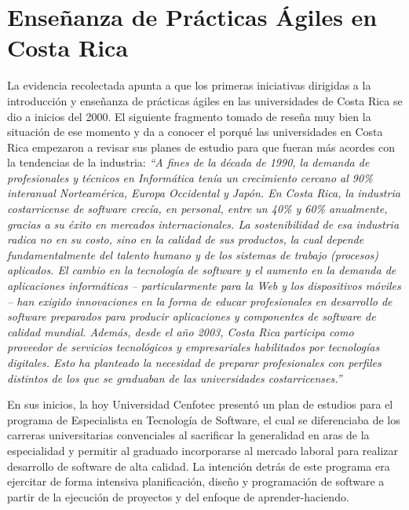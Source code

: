 \section{Enseñanza de Prácticas Ágiles en Costa Rica} \label{sec:costa-rica}
La evidencia recolectada apunta a que los primeras iniciativas dirigidas a la introducción y enseñanza de prácticas ágiles en las universidades de Costa Rica se dio a inicios del 2000. El siguiente fragmento tomado de \cite{cenfotec-2} reseña muy bien la situación de ese momento y da a conocer el porqué las universidades en Costa Rica empezaron a revisar sus planes de estudio para que fueran más acordes con la tendencias de la industria: \emph{``A fines de la década de 1990, la demanda de profesionales y técnicos en Informática tenía un crecimiento cercano al 90\% interanual Norteamérica, Europa Occidental y Japón. En Costa Rica, la industria costarricense de software crecía, en personal, entre un 40\% y 60\% anualmente, gracias a su éxito en mercados internacionales. La sostenibilidad de esa industria radica no en su costo, sino en la calidad de sus productos, la cual depende fundamentalmente del talento humano y de los sistemas de trabajo (procesos) aplicados. El cambio en la tecnología de software y el aumento en la demanda de aplicaciones informáticas – particularmente para la Web y los dispositivos móviles – han exigido innovaciones en la forma de educar profesionales en desarrollo de software preparados para producir aplicaciones y componentes de software de calidad mundial. Además, desde el año 2003, Costa Rica participa como proveedor de servicios tecnológicos y empresariales habilitados por tecnologías digitales. Esto ha planteado la necesidad de preparar profesionales con perfiles distintos de los que se graduaban de las universidades costarricenses.''}

En sus inicios, la hoy Universidad Cenfotec \cite{cenfotec-1} presentó un plan de estudios para el programa de Especialista en Tecnología de Software, el cual se diferenciaba de los carreras universitarias convenciales al sacrificar la generalidad en aras de la especialidad y permitir al graduado incorporarse al mercado laboral para realizar desarrollo de software de alta calidad. La intención detrás de este programa era ejercitar de forma intensiva planificación, diseño y programación de software a partir de la ejecución de proyectos y del enfoque de aprender-haciendo.

